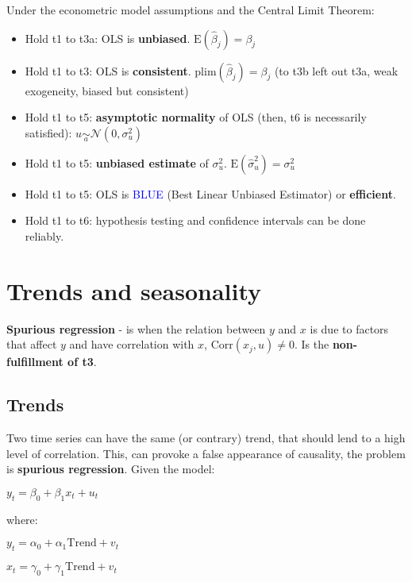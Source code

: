 \documentclass[10pt, a4paper, landscape]{extarticle}
\newcommand{\E}{\mathrm{E}}
\newcommand{\Corr}{\mathrm{Corr}}
\begin{document}
\begin{multicols}{3}
Under the econometric model assumptions and the Central Limit Theorem:

\begin{itemize}[leftmargin=*]
	\item Hold t1 to t3a: OLS is \textbf{unbiased}. $\E(\hat{\beta}_j) = \beta_j$
	\item Hold t1 to t3: OLS is \textbf{consistent}. $\mathrm{plim}(\hat{\beta}_j) = \beta_j$ (to t3b left out t3a, weak exogeneity, biased but consistent)
	\item Hold t1 to t5: \textbf{asymptotic normality} of OLS (then, t6 is necessarily satisfied): $u \underset{a}{\sim} \mathcal{N} (0, \sigma^2_u)$
	\item Hold t1 to t5: \textbf{unbiased estimate} of $\sigma^2_u$. $\E(\hat{\sigma}^2_u) = \sigma^2_u$
	\item Hold t1 to t5: OLS is \textcolor{blue}{BLUE} (Best Linear Unbiased Estimator) or \textbf{efficient}. 
	\item Hold t1 to t6: hypothesis testing and confidence intervals can be done reliably.
\end{itemize}

\columnbreak

\section*{Trends and seasonality}

\textbf{Spurious regression} - is when the relation between $y$ and $x$ is due to factors that affect $y$ and have correlation with $x$, $\Corr(x_j, u) \neq 0$. Is the \textbf{non-fulfillment of t3}.

\subsection*{Trends}

Two time series can have the same (or contrary) trend, that should lend to a high level of correlation. This, can provoke a false appearance of causality, the problem is \textbf{spurious regression}. Given the model:

\begin{center}
	$y_t = \beta_0 + \beta_1 x_t + u_t$
\end{center}

where:

\begin{center}
	$y_t = \alpha_0 + \alpha_1 \mathrm{Trend} + v_t$

	$x_t = \gamma_0 + \gamma_1 \mathrm{Trend} + v_t$
\end{center}


\end{multicols}
\end{document}
